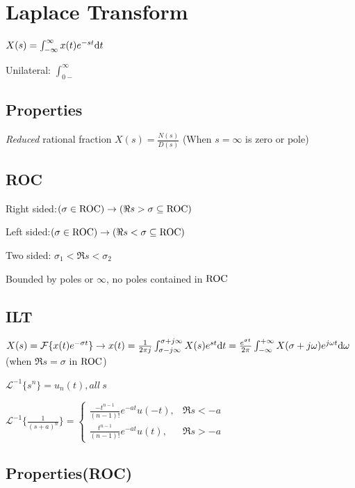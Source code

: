 
\section{Laplace Transform}

$X(s) = \int_{-\infty}^{\infty} x(t) e^{-st} \mathrm{d}  t$

Unilateral: $\int_{0-}^{\infty}$

\subsection*{Properties}

\emph{Reduced} rational fraction $X(s) = \frac{N(s)}{D(s)}$ (When $s=\infty$ is zero or pole)

\subsection*{ROC}

Right sided:$(\sigma \in \text{ROC}) \to (\Re{s}>\sigma \subseteq \text{ROC})$

Left sided:$(\sigma \in \text{ROC}) \to (\Re{s}<\sigma \subseteq \text{ROC})$

Two sided: $\sigma_1<\Re s<\sigma_2$

Bounded by poles or $\infty$, no poles contained in $\text{ROC}$

\subsection*{ILT}

$X(s)=\mathcal F\{x(t)e^{-\sigma t}\}\to x(t)=\frac{1}{2\pi j} \int_{\sigma-j\infty}^{\sigma+j\infty} X(s) e^{st}\mathrm{d} t \\ = \frac{e^{\sigma t}}{2\pi}\int_{-\infty}^{+\infty} X(\sigma + j\omega) e^{j\omega t}\mathrm{d} \omega$ (when $\Re s =\sigma$ in $\text{ROC}$)

$\mathcal L^{-1}\{s^n\} = u_n(t), all~s$

$\mathcal L^{-1}\{\frac{1}{(s+a)^n}\} = \begin{cases} \frac{-t^{n-1}}{(n-1)!}e^{-at}u(-t), & \Re s <-a\\ \frac{t^{n-1}}{(n-1)!}e^{-at}u(t), & \Re s >-a\end{cases}$

\subsection*{Properties(ROC)}

